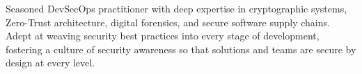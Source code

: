 \begin{cvparagraph}

Seasoned DevSecOps practitioner with deep expertise in cryptographic systems, Zero-Trust architecture, digital
forensics, and secure software supply chains. Adept at weaving security best practices into every stage of
development, fostering a culture of security awareness so that solutions and teams are secure by design at every
level.

\end{cvparagraph}
